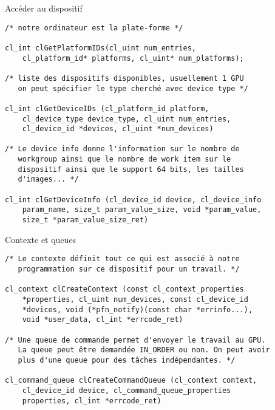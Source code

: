 \documentclass[10pt]{beamer}
\begin{document}
\begin{frame}{Accéder au dispositif}

  \scriptsize
  \begin{verbatim}
/* notre ordinateur est la plate-forme */

cl_int clGetPlatformIDs(cl_uint num_entries,
    cl_platform_id* platforms, cl_uint* num_platforms);

/* liste des dispositifs disponibles, usuellement 1 GPU
   on peut spécifier le type cherché avec device type */

cl_int clGetDeviceIDs (cl_platform_id platform,
    cl_device_type device_type, cl_uint num_entries,
    cl_device_id *devices, cl_uint *num_devices)

/* Le device info donne l'information sur le nombre de
   workgroup ainsi que le nombre de work item sur le
   dispositif ainsi que le support 64 bits, les tailles
   d'images... */

cl_int clGetDeviceInfo (cl_device_id device, cl_device_info
    param_name, size_t param_value_size, void *param_value,
    size_t *param_value_size_ret)
  \end{verbatim}
\end{frame}

\begin{frame}[fragile]{Contexte et queues}

  \scriptsize
  \begin{verbatim}
/* Le contexte définit tout ce qui est associé à notre
   programmation sur ce dispositif pour un travail. */

cl_context clCreateContext (const cl_context_properties
    *properties, cl_uint num_devices, const cl_device_id
    *devices, void (*pfn_notify)(const char *errinfo...),
    void *user_data, cl_int *errcode_ret)

/* Une queue de commande permet d'envoyer le travail au GPU.
   La queue peut être demandée IN_ORDER ou non. On peut avoir
   plus d'une queue pour des tâches indépendantes. */

cl_command_queue clCreateCommandQueue (cl_context context,
    cl_device_id device, cl_command_queue_properties
    properties, cl_int *errcode_ret)
  \end{verbatim}
\end{frame}
\end{document}
